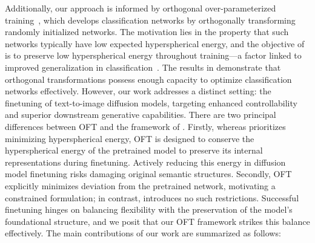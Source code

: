 Additionally, our approach is informed by orthogonal over-parameterized training~\cite{liu2021orthogonal}, which develops classification networks by orthogonally transforming randomly initialized networks. The motivation lies in the property that such networks typically have low expected hyperspherical energy, and the objective of \cite{liu2021orthogonal} is to preserve low hyperspherical energy throughout training—a factor linked to improved generalization in classification~\cite{liu2018learning,lin2020regularizing}. The results in \cite{liu2021orthogonal} demonstrate that orthogonal transformations possess enough capacity to optimize classification networks effectively. However, our work addresses a distinct setting: the finetuning of text-to-image diffusion models, targeting enhanced controllability and superior downstream generative capabilities. There are two principal differences between OFT and the framework of \cite{liu2021orthogonal}. Firstly, whereas \cite{liu2021orthogonal} prioritizes minimizing hyperspherical energy, OFT is designed to conserve the hyperspherical energy of the pretrained model to preserve its internal representations during finetuning. Actively reducing this energy in diffusion model finetuning risks damaging original semantic structures. Secondly, OFT explicitly minimizes deviation from the pretrained network, motivating a constrained formulation; in contrast, \cite{liu2021orthogonal} introduces no such restrictions. Successful finetuning hinges on balancing flexibility with the preservation of the model’s foundational structure, and we posit that our OFT framework strikes this balance effectively. The main contributions of our work are summarized as follows:


